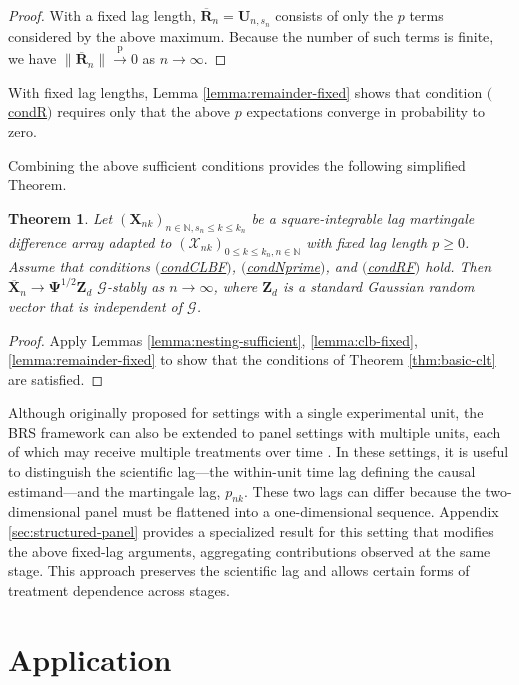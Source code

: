 \documentclass[11pt]{article}
\renewcommand\vec[1]{\boldsymbol{#1}}
\newcommand\mat[1]{\mathbf{#1}}
\newcommand{\N}{\mathbb{N}}
\newcommand{\G}{\mathcal{G}}
\newcommand{\X}{\mathcal{X}}
\newcommand{\refitem}[1]{$\mathrm{(}$\hyperlink{cond:#1}{\csname cond#1\endcsname}$\mathrm{)}$}
\newcommand{\pconverge}{\overset{\mathrm{p}}{\to}}
\newtheorem{theorem}{Theorem}
\theoremstyle{definition}
\begin{document}
\begin{proof}
With a fixed lag length, $\overline{\vec{R}}_n = \vec{U}_{n,s_n}$ consists of only the $p$ terms considered by the above maximum.
Because the number of such terms is finite, we have $\|\overline{\vec{R}}_n\| \pconverge 0$ as $n \to \infty$.
\end{proof}

With fixed lag lengths, Lemma \ref{lemma:remainder-fixed} shows that condition \refitem{R} requires only that the above $p$ expectations converge in probability to zero.

Combining the above sufficient conditions provides the following simplified Theorem.

\begin{theorem}\label{thm:fixed-clt}
Let $(\vec{X}_{nk})_{n \in \N, s_n \leq k \leq k_n}$ be a square-integrable lag martingale difference array adapted to $(\X_{nk})_{0 \leq k \leq k_n, n \in \N}$ with fixed lag length $p \geq 0$.
Assume that conditions \refitem{CLBF}, \refitem{Nprime}, and \refitem{RF} hold.
Then $\overline{\vec{X}}_n \to \mat{\Psi}^{1/2} \vec{Z}_d$ $\G$-stably as $n \to \infty$, where $\vec{Z}_d$ is a standard Gaussian random vector that is independent of $\G$.
\end{theorem}

\begin{proof}
Apply Lemmas \ref{lemma:nesting-sufficient}, \ref{lemma:clb-fixed}, \ref{lemma:remainder-fixed} to show that the conditions of Theorem \ref{thm:basic-clt} are satisfied.
\end{proof}

Although originally proposed for settings with a single experimental unit, the BRS framework can also be extended to panel settings with multiple units, each of which may receive multiple treatments over time \citep{bojinov_panel_2021}.
In these settings, it is useful to distinguish the scientific lag---the within-unit time lag defining the causal estimand---and the martingale lag, $p_{nk}$.
These two lags can differ because the two-dimensional panel must be flattened into a one-dimensional sequence.
Appendix \ref{sec:structured-panel} provides a specialized result for this setting that modifies the above fixed-lag arguments, aggregating contributions observed at the same stage.
This approach preserves the scientific lag and allows certain forms of treatment dependence across stages.

\section{Application}\label{sec:application}
\end{document}

